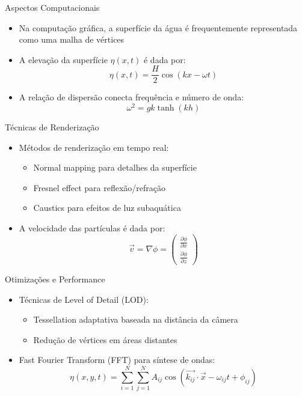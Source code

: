 \documentclass[aspectratio=169,xcolor=table]{beamer}
\begin{document}
\begin{frame}{Aspectos Computacionais}
    \begin{itemize}
        \item Na computação gráfica, a superfície da água é frequentemente representada como uma malha de vértices
        \item A elevação da superfície $\eta(x,t)$ é dada por:
        \[\eta(x,t) = \frac{H}{2}\cos(kx-\omega t)\]
        \item A relação de dispersão conecta frequência e número de onda:
        \[\omega^2 = gk\tanh(kh)\]
    \end{itemize}
\end{frame}

\begin{frame}{Técnicas de Renderização}
    \begin{itemize}
        \item Métodos de renderização em tempo real:
        \begin{itemize}
            \item Normal mapping para detalhes da superfície
            \item Fresnel effect para reflexão/refração
            \item Caustics para efeitos de luz subaquática
        \end{itemize}
        \item A velocidade das partículas é dada por:
        \[\vec{v} = \nabla\phi = \begin{pmatrix}
            \frac{\partial \phi}{\partial x} \\
            \frac{\partial \phi}{\partial z}
        \end{pmatrix}\]
    \end{itemize}
\end{frame}

\begin{frame}{Otimizações e Performance}
    \begin{itemize}
        \item Técnicas de Level of Detail (LOD):
        \begin{itemize}
            \item Tessellation adaptativa baseada na distância da câmera
            \item Redução de vértices em áreas distantes
        \end{itemize}
        \item Fast Fourier Transform (FFT) para síntese de ondas:
        \[\eta(x,y,t) = \sum_{i=1}^N \sum_{j=1}^N A_{ij}\cos(\vec{k_{ij}}\cdot\vec{x} - \omega_{ij}t + \phi_{ij})\]
    \end{itemize}
\end{frame}
\end{document}

